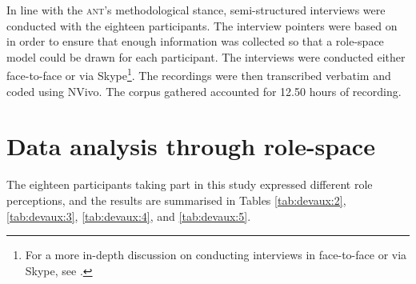 \documentclass[output=paper]{langsci/langscibook}
\begin{document}
In line with the \textsc{ant}’s methodological stance, semi-structured interviews were conducted with the eighteen participants. The interview pointers were based on  in order to ensure that enough information was collected so that a role-space model could be drawn for each participant. The interviews were conducted either face-to-face or via Skype\footnote{For a more in-depth discussion on conducting interviews in face-to-face or via Skype, see \citet{Devaux2017b}.}. The recordings were then transcribed verbatim and coded using NVivo. The corpus gathered accounted for 12.50 hours of recording. 

\section{Data analysis through role-space}
\label{sec:devaux:5}
The eighteen participants taking part in this study expressed different role perceptions, and the results are summarised in Tables \ref{tab:devaux:2}, \ref{tab:devaux:3}, \ref{tab:devaux:4}, and \ref{tab:devaux:5}.

\begin{table}
\caption{Role-space in \textsc{vci} A\label{tab:devaux:2}}
\end{table}
\end{document}
